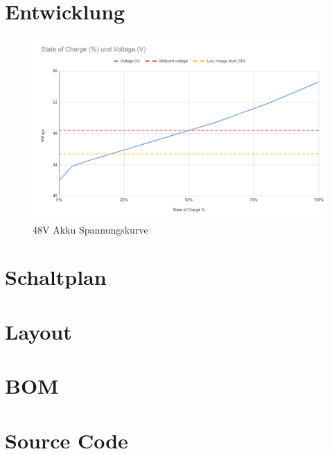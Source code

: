 \documentclass[paper=a4,11pt]{scrreprt}
\begin{document}
\chapter{Entwicklung}
\begin{figure}[ht]
\begin{center}
\includegraphics[angle=90,width=14cm]{Bilder/StateofC.PNG}
\caption{48V Akku Spannungskurve}
\label{stateofC}
\end{center}
\end{figure}

\chapter{Schaltplan}


\chapter{Layout}

\chapter{BOM}


\chapter{Source Code}
\end{document}
